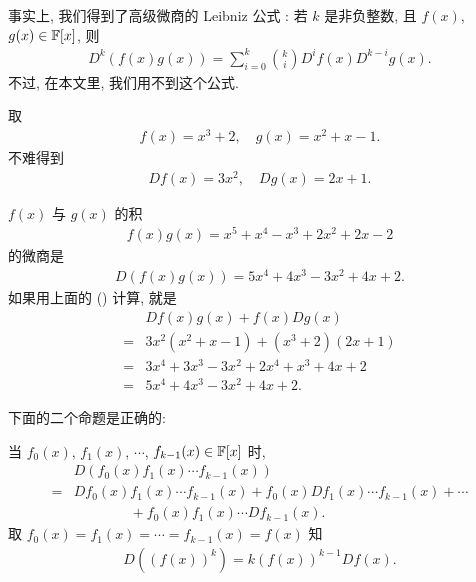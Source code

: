 \begin{remark}
    事实上, 我们得到了高级微商的 Leibniz 公式 : 若 $k$ 是非负整数, 且 $f(x)$, $g(x) \in \mathbb{F}[x]$, 则
    \begin{align*}
        D^k (f(x)g(x)) = \sum_{i = 0}^{k} \binom{k}{i} D^i f(x) D^{k-i} g(x).
    \end{align*}
    不过, 在本文里, 我们用不到这个公式.
\end{remark}

\begin{example}
    取
    \begin{align*}
        f(x) = x^3 + 2, \quad g(x) = x^2 + x - 1.
    \end{align*}
    不难得到
    \begin{align*}
        Df (x) = 3x^2, \quad Dg (x) = 2x + 1.
    \end{align*}

    $f(x)$ 与 $g(x)$ 的积
    \begin{align*}
        f(x) g(x) = x^5 + x^4 - x^3 + 2x^2 + 2x - 2
    \end{align*}
    的微商是
    \begin{align*}
        D(f(x) g(x)) = 5x^4 + 4x^3 - 3x^2 + 4x + 2.
    \end{align*}
    如果用上面的 (\myStar) 计算, 就是
    \begin{align*}
             & Df (x) g(x) + f(x) Dg (x)                \\
        = {} & 3x^2 (x^2 + x - 1) + (x^3 + 2) (2x + 1)  \\
        = {} & 3x^4 + 3x^3 - 3x^2 + 2x^4 + x^3 + 4x + 2 \\
        = {} & 5x^4 + 4x^3 - 3x^2 + 4x + 2.
    \end{align*}
\end{example}

下面的二个命题是正确的:

\begin{proposition}
    当 $f_0 (x)$, $f_1 (x)$, $\cdots$, $f_{k-1} (x) \in \mathbb{F}[x]$ 时,
    \begin{align*}
             & D(f_0 (x) f_1 (x) \cdots f_{k-1} (x))                                              \\
        = {} & Df_0 (x) f_1 (x) \cdots f_{k-1} (x) + f_0 (x) Df_1 (x) \cdots f_{k-1} (x) + \cdots \\
             & \qquad \qquad + f_0 (x) f_1 (x) \cdots Df_{k-1} (x).
    \end{align*}
    取 $f_0 (x) = f_1 (x) = \cdots = f_{k-1} (x) = f(x)$ 知
    \begin{align*}
        D((f(x))^k) = k(f(x))^{k-1} Df(x).
    \end{align*}
\end{proposition}


